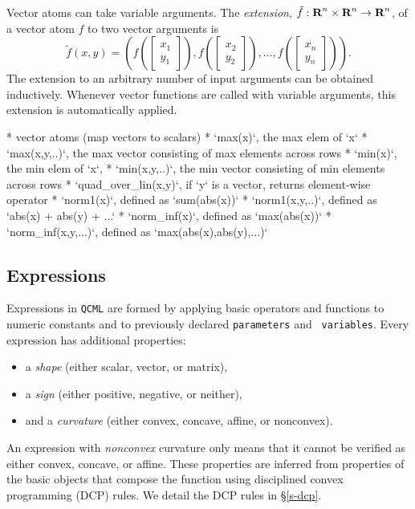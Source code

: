 \documentclass[11pt]{article}
\def\qcml{\texttt{QCML}\xspace}
\newcommand{\reals}{{\mbox{\bf R}}}
\begin{document}
Vector atoms can take variable arguments. 
The \emph{extension}, $\tilde f : \reals^n \times \reals^n \to \reals^n$, of 
a vector atom $f$ to two vector arguments is
\[
\tilde f(x, y) = \left( f\left(\begin{bmatrix} x_1 \\ y_1 \end{bmatrix}\right), 
  f\left(\begin{bmatrix}x_2 \\ y_2 \end{bmatrix}\right), \ldots, 
  f\left(\begin{bmatrix}x_n \\ y_n\end{bmatrix}\right) \right).
\]
The extension to an arbitrary number of input arguments can be obtained inductively.
Whenever vector functions are called with variable arguments, this extension
is automatically applied.

* vector atoms (map vectors to scalars)
  * `max(x)`, the max elem of `x`
  * `max(x,y,..)`, the max vector consisting of max elements across rows
  * `min(x)`, the min elem of `x`,
  * `min(x,y,..)`, the min vector consisting of min elements across rows
  * `quad\_over\_lin(x,y)`, if `y` is a vector, returns element-wise operator
  * `norm1(x)`, defined as `sum(abs(x))`
  * `norm1(x,y,..)`, defined as `abs(x) + abs(y) + ...`
  * `norm\_inf(x)`, defined as `max(abs(x))`
  * `norm\_inf(x,y,...)`, defined as `max(abs(x),abs(y),...)`
  
\subsection{Expressions}
Expressions in \qcml are formed by applying basic operators and functions to
numeric constants and to previously declared {\tt parameters} and {\tt
variables}. Every expression has additional properties:
\begin{itemize}
\item a \emph{shape} (either scalar, vector, or matrix),
\item a \emph{sign} (either positive, negative, or neither),
\item and a \emph{curvature} (either convex, concave, affine, or nonconvex).
\end{itemize}
An expression with \emph{nonconvex} curvature only means that it cannot be verified as either convex, concave, or affine. These properties are inferred from properties of the basic objects that compose the function using disciplined convex programming (DCP) rules. We detail the DCP rules in \S\ref{s-dcp}.
\end{document}
